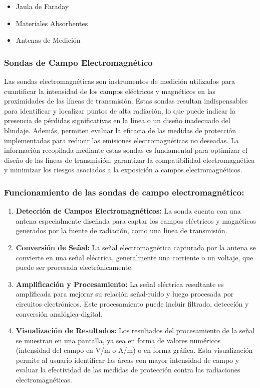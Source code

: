             \begin{itemize}
              \item Jaula de Faraday
              \item Materiales Absorbentes
              \item Antenas de Medición
            \end{itemize}

        \subsubsection{Sondas de Campo Electromagnético}

            Las sondas electromagnéticas son instrumentos de medición utilizados para cuantificar la intensidad de los campos eléctricos y magnéticos en las proximidades de las líneas de transmisión. Estas sondas resultan indispensables para identificar y localizar puntos de alta radiación, lo que puede indicar la presencia de pérdidas significativas en la línea o un diseño inadecuado del blindaje. Además, permiten evaluar la eficacia de las medidas de protección implementadas para reducir las emisiones electromagnéticas no deseadas. La información recopilada mediante estas sondas es fundamental para optimizar el diseño de las líneas de transmisión, garantizar la compatibilidad electromagnética y minimizar los riesgos asociados a la exposición a campos electromagnéticos.

        \subsubsection*{Funcionamiento de las sondas de campo electromagnético:}

            \begin{enumerate}
                \item \textbf{Detección de Campos Electromagnéticos:} La sonda cuenta con una antena especialmente diseñada para captar los campos eléctricos y magnéticos generados por la fuente de radiación, como una línea de transmisión.
                \item \textbf{Conversión de Señal:} La señal electromagnética capturada por la antena se convierte en una señal eléctrica, generalmente una corriente o un voltaje, que puede ser procesada electrónicamente.
                \item \textbf{Amplificación y Procesamiento:} La señal eléctrica resultante es amplificada para mejorar su relación señal-ruido y luego procesada por circuitos electrónicos. Este procesamiento puede incluir filtrado, detección y conversión analógica-digital.
                \item \textbf{Visualización de Resultados:} Los resultados del procesamiento de la señal se muestran en una pantalla, ya sea en forma de valores numéricos (intensidad del campo en V/m o A/m) o en forma gráfica. Esta visualización permite al usuario identificar las áreas con mayor intensidad de campo y evaluar la efectividad de las medidas de protección contra las radiaciones electromagnéticas.
            \end{enumerate}

